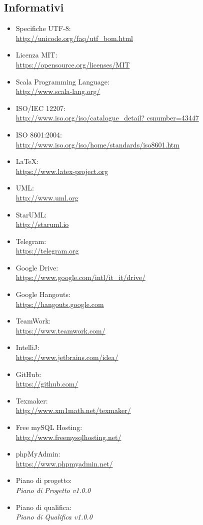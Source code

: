 \documentclass[a4paper]{report}
\begin{document}
		\subsection{Informativi}
			\begin{itemize}
				\item Specifiche UTF-8: \\ \url{http://unicode.org/faq/utf_bom.html}
				\item Licenza MIT: \\ \url{https://opensource.org/licenses/MIT}
				\item Scala Programming Language: \\ \url{http://www.scala-lang.org/}
				\item ISO/IEC 12207: \\ \url{http://www.iso.org/iso/catalogue_detail?
				csnumber=43447}
				\item ISO 8601:2004: \\ \url{http://www.iso.org/iso/home/standards/iso8601.htm}
				\item \LaTeX: \\ \url{https://www.latex-project.org}
				\item UML: \\ \url{http://www.uml.org}
				\item StarUML: \\ \url{http://staruml.io}
				\item Telegram: \\ \url{https://telegram.org}
				\item Google Drive: \\ \url{https://www.google.com/intl/it_it/drive/}
				\item Google Hangouts: \\ \url{https://hangouts.google.com}
				\item TeamWork: \\ \url{https://www.teamwork.com/}
				\item IntelliJ: \\ \url{https://www.jetbrains.com/idea/}
				\item GitHub: \\ \url{https://github.com/}
				\item Texmaker: \\ \url{http://www.xm1math.net/texmaker/}
				\item Free mySQL Hosting: \\ \url{http://www.freemysqlhosting.net/} 
				\item phpMyAdmin: \\ \url{https://www.phpmyadmin.net/}
				\item Piano di progetto: \\ \emph{Piano di Progetto v1.0.0}
				\item Piano di qualifica: \\ \emph{Piano di Qualifica v1.0.0}
			\end{itemize}
\end{document}
